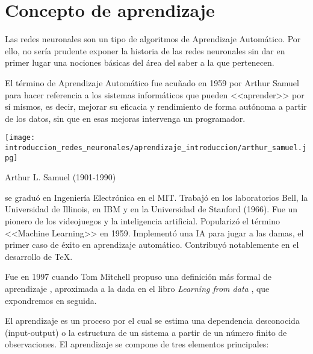 %

\section{Concepto de aprendizaje}\label{ch:Aprendizaje}

Las redes neuronales son un tipo de algoritmos de Aprendizaje Automático. Por ello, no sería prudente exponer la historia de las redes neuronales sin dar en primer lugar una nociones básicas del área del saber a la que pertenecen.

El término de Aprendizaje Automático 
\cite{hisour} 
fue acuñado en 1959 por Arthur Samuel 
para hacer referencia a los sistemas informáticos que 
pueden <<aprender>> por sí mismos, es decir, mejorar su 
eficacia y rendimiento de forma autónoma a partir de los datos, 
sin que en esas mejoras intervenga un programador.

\begin{marginfigure}
    \texttt{[image: introduccion\_redes\_neuronales/aprendizaje\_introduccion/arthur\_samuel.jpg]}
    \caption{Arthur L. Samuel (1901-1990) }
    \cite{samuel-wikipedia}
    \small
     se graduó en Ingeniería Electrónica en el MIT. 
     Trabajó en los laboratorios Bell, la Universidad de Illinois,
      en IBM y en la Universidad de Stanford (1966). 
      Fue un pionero de los videojuegos y la inteligencia artificial. 
      Popularizó el término <<Machine Learning>> en 1959. 
      Implementó una IA para jugar a las damas, el primer caso  
      de éxito en aprendizaje automático. Contribuyó notablemente 
      en el desarrollo de TeX.
\end{marginfigure}

Fue en 1997 cuando Tom Mitchell propuso una definición 
más formal de aprendizaje 
\cite{tom-michell-machine-learning}, 
aproximada a la dada en el libro \textit{Learning from data}
\cite{learning-from-data-1-2}, que expondremos en seguida.

El aprendizaje es un proceso por el cual se estima una dependencia desconocida 
(input-output) o la estructura de un sistema a partir de un número finito de 
observaciones.  El aprendizaje se compone de tres elementos principales: 

